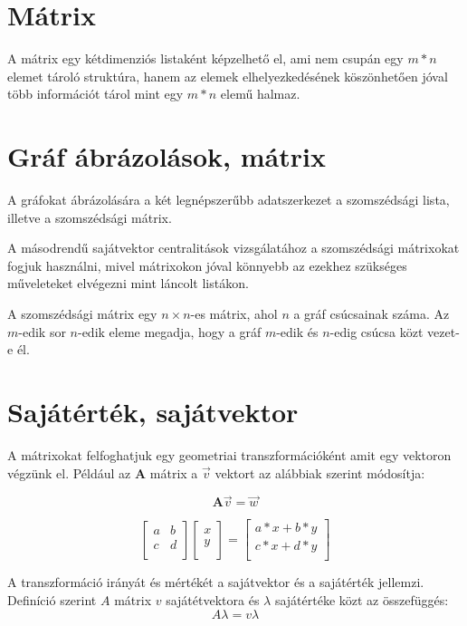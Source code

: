 \documentclass[12pt,numbers=noenddot]{report}
\begin{document}
\section{Mátrix}
A mátrix egy kétdimenziós listaként képzelhető el, ami nem csupán egy $m * n$ elemet tároló struktúra, hanem az elemek elhelyezkedésének köszönhetően jóval több információt tárol mint egy $m * n$ elemű halmaz.

\section{Gráf ábrázolások, mátrix}
A gráfokat ábrázolására a két legnépszerűbb adatszerkezet a szomszédsági lista, illetve a szomszédsági mátrix.

A másodrendű sajátvektor centralitások vizsgálatához a szomszédsági mátrixokat fogjuk használni, mivel mátrixokon jóval könnyebb az ezekhez szükséges műveleteket elvégezni mint láncolt listákon.

A szomszédsági mátrix egy $n \times n$-es mátrix, ahol $n$ a gráf csúcsainak száma. Az $m$-edik sor $n$-edik eleme megadja, hogy a gráf $m$-edik és $n$-edig csúcsa közt vezet-e él.


\pagebreak

\section{Sajátérték, sajátvektor}
A mátrixokat felfoghatjuk egy geometriai transzformációként amit egy vektoron végzünk el. Például az $\textbf{A}$ mátrix a $\vec{v}$ vektort az alábbiak szerint módosítja:

$$
\textbf{A} \vec{v} = \vec{w}
$$

$$
{
	\begin{bmatrix}
		a & b \\
		c & d \\
	\end{bmatrix}
}
{
	\begin{bmatrix}
		x \\
		y \\
	\end{bmatrix}
}
=
{
	\begin{bmatrix}
		a*x+b*y \\
		c*x+d*y \\
	\end{bmatrix}
}
$$

\vspace{1cm}

A transzformáció irányát és mértékét a sajátvektor és a sajátérték jellemzi.
Definíció szerint $A$ mátrix $v$ sajátétvektora és $\lambda$ sajátértéke közt az összefüggés: $$A \lambda = v \lambda$$
\end{document}
